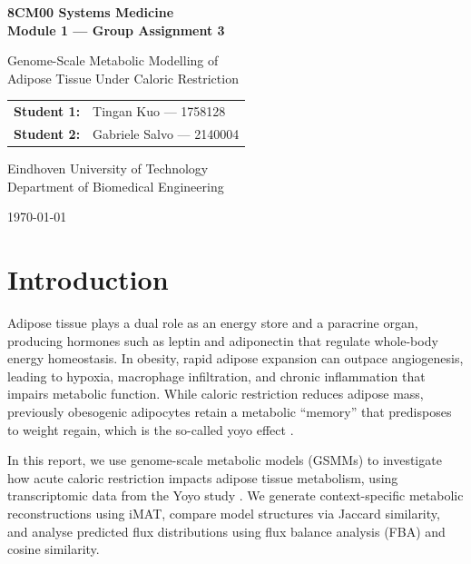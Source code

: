 \documentclass[11pt, a4paper]{article}
\begin{document}
\begin{titlepage}
\centering
\vspace*{3cm}
{\LARGE\bfseries 8CM00 Systems Medicine\\[0.3cm]
Module 1 — Group Assignment 3\par}
\vspace{1.5cm}
{\Large Genome-Scale Metabolic Modelling of\\
Adipose Tissue Under Caloric Restriction\par}
\vspace{2cm}
{\large
\begin{tabular}{ll}
    \textbf{Student 1:} & Tingan Kuo — 1758128 \\
    \textbf{Student 2:} & Gabriele Salvo — 2140004 \\
\end{tabular}
\par}
\vspace{1.5cm}
{\large Eindhoven University of Technology\\
Department of Biomedical Engineering\par}
\vspace{1cm}
{\large \today\par}
\vfill
\end{titlepage}

\tableofcontents
\newpage

\section{Introduction}
\label{sec:intro}

Adipose tissue plays a dual role as an energy store and a paracrine organ, producing hormones such as leptin and adiponectin that regulate whole-body energy homeostasis. In obesity, rapid adipose expansion can outpace angiogenesis, leading to hypoxia, macrophage infiltration, and chronic inflammation that impairs metabolic function. While caloric restriction reduces adipose mass, previously obesogenic adipocytes retain a metabolic ``memory'' that predisposes to weight regain, which is the so-called yoyo effect \citep{vink2017}.

In this report, we use genome-scale metabolic models (GSMMs) to investigate how acute caloric restriction impacts adipose tissue metabolism, using transcriptomic data from the Yoyo study \citep{vink2017}. We generate context-specific metabolic reconstructions using iMAT, compare model structures via Jaccard similarity, and analyse predicted flux distributions using flux balance analysis (FBA) and cosine similarity.
\end{document}
